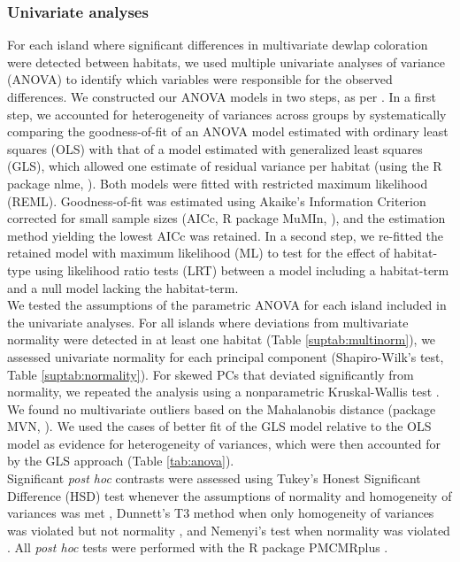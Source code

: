 \subsubsection*{Univariate analyses}

For each island where significant differences in multivariate dewlap coloration were detected between habitats, we used multiple univariate analyses of variance (ANOVA) to identify which variables were responsible for the observed differences. We constructed our ANOVA models in two steps, as per \citet{Zuur2009}. In a first step, we accounted for heterogeneity of variances across groups by systematically comparing the goodness-of-fit of an ANOVA model estimated with ordinary least squares (OLS) with that of a model estimated with generalized least squares (GLS), which allowed one estimate of residual variance per habitat (using the R package nlme, \citealt{Pinheiro2000, Pinheiro2020}). Both models were fitted with restricted maximum likelihood (REML). Goodness-of-fit was estimated using Akaike's Information Criterion corrected for small sample sizes (AICc, R package MuMIn, \citealt{Barton2019}), and the estimation method yielding the lowest AICc was retained. In a second step, we re-fitted the retained model with maximum likelihood (ML) to test for the effect of habitat-type using likelihood ratio tests (LRT) between a model including a habitat-term and a null model lacking the habitat-term.\\

We tested the assumptions of the parametric ANOVA for each island included in the univariate analyses. For all islands where deviations from multivariate normality were detected in at least one habitat (Table \ref{suptab:multinorm}), we assessed univariate normality for each principal component (Shapiro-Wilk's test, Table \ref{suptab:normality}). For skewed PCs that deviated significantly from normality, we repeated the analysis using a nonparametric Kruskal-Wallis test \citep{Hollander2013}. We found no multivariate outliers based on the Mahalanobis distance (package MVN, \citealt{Korkmaz2014}). We used the cases of better fit of the GLS model relative to the OLS model as evidence for heterogeneity of variances, which were then accounted for by the GLS approach (Table \ref{tab:anova}).\\

Significant \textit{post hoc} contrasts were assessed using Tukey's Honest Significant Difference (HSD) test whenever the assumptions of normality and homogeneity of variances was met \citep{Tukey1949}, Dunnett's T3 method when only homogeneity of variances was violated but not normality \citep{Dunnett1980}, and Nemenyi's test when normality was violated \citep{Nemenyi1963}. All \textit{post hoc} tests were performed with the R package PMCMRplus \citep{Pohlert2020}.\\

